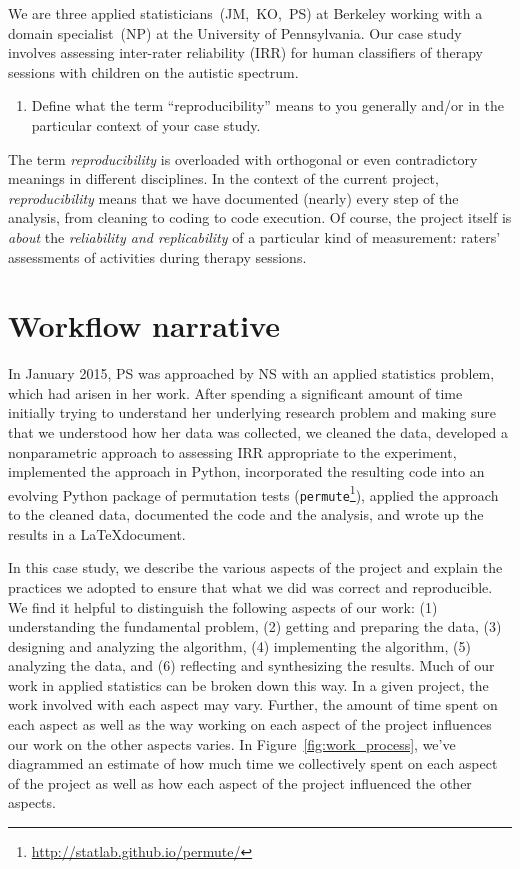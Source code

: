 \documentclass[]{article}
\begin{document}
We are three applied statisticians~(JM,~KO,~PS) at Berkeley working with a
domain specialist~(NP) at the University of Pennsylvania. Our case study
involves assessing inter-rater reliability (IRR) for human classifiers of
therapy sessions with children on the autistic spectrum.

\begin{enumerate}
\def\labelenumi{\arabic{enumi})}
\setcounter{enumi}{1}
\itemsep1pt\parskip0pt
\item
  Define what the term ``reproducibility'' means to you generally and/or
  in the particular context of your case study.
\end{enumerate}

The term \emph{reproducibility} is overloaded with orthogonal or even
contradictory meanings in different disciplines. In the context of the current
project, \emph{reproducibility} means that we have documented (nearly) every
step of the analysis, from cleaning to coding to code execution. Of course, the
project itself is \emph{about} the \emph{reliability and replicability} of a
particular kind of measurement: raters' assessments of activities during
therapy sessions.


\section{Workflow narrative}\label{workflow-narrative}

In January 2015, PS was approached by NS with an applied statistics
problem, which had arisen in her work.
After spending a significant amount of time initially trying to understand her
underlying research problem and making sure that we understood how her data was
collected, we cleaned the data, developed a nonparametric approach to assessing
IRR appropriate to the experiment, implemented the approach in Python,
incorporated the resulting code into an evolving Python package of permutation
tests (\texttt{permute}\footnote{\url{http://statlab.github.io/permute/}}),
applied the approach to the cleaned data, documented the code and the analysis,
and wrote up the results in a \LaTeX document. 

In this case study, we describe the various aspects of the project and explain
the practices we adopted to ensure that what we did was correct and
reproducible.
We find it helpful to distinguish the following aspects of our work:  (1)
understanding the fundamental problem, (2) getting and preparing the data,
(3) designing and analyzing the algorithm, (4) implementing the algorithm,
(5) analyzing the data, and (6) reflecting and synthesizing the results.
Much of our work in applied statistics can be broken down this way.
In a given project, the work involved with each aspect may vary.
Further, the amount of time spent on each aspect as well as the way
working on each aspect of the project influences our work on the
other aspects varies.
In Figure~\ref{fig:work_process}, we've diagrammed an estimate of how much time
we collectively spent on each aspect of the project as well as how each aspect
of the project influenced the other aspects.
\end{document}
